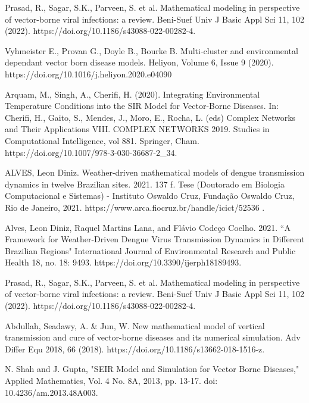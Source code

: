 \documentclass[12pt]{article}
\begin{document}
\noindent [2] Prasad, R., Sagar, S.K., Parveen, S. et al. Mathematical modeling in perspective of vector-borne viral infections: a review. Beni-Suef Univ J Basic Appl Sci 11, 102 (2022). https://doi.org/10.1186/s43088-022-00282-4.

\noindent [3] Vyhmeister E., Provan G., Doyle B., Bourke B. Multi-cluster and environmental dependant vector born disease models. Heliyon, Volume 6, Issue 9 (2020). https://doi.org/10.1016/j.heliyon.2020.e04090

\noindent [4] Arquam, M., Singh, A., Cherifi, H. (2020). Integrating Environmental Temperature Conditions into the SIR Model for Vector-Borne Diseases. In: Cherifi, H., Gaito, S., Mendes, J., Moro, E., Rocha, L. (eds) Complex Networks and Their Applications VIII. COMPLEX NETWORKS 2019. Studies in Computational Intelligence, vol 881. Springer, Cham. https://doi.org/10.1007/978-3-030-36687-2\_34.

\noindent [5] ALVES, Leon Diniz. Weather-driven mathematical models of dengue transmission dynamics in twelve Brazilian sites. 2021. 137 f. Tese (Doutorado em Biologia Computacional e Sistemas) - Instituto Oswaldo Cruz, Fundação Oswaldo Cruz, Rio de Janeiro, 2021. https://www.arca.fiocruz.br/handle/icict/52536	.

\noindent [6] Alves, Leon Diniz, Raquel Martins Lana, and Flávio Codeço Coelho. 2021. ``A Framework for Weather-Driven Dengue Virus Transmission Dynamics in Different Brazilian Regions" International Journal of Environmental Research and Public Health 18, no. 18: 9493. https://doi.org/10.3390/ijerph18189493.

\noindent [7] Prasad, R., Sagar, S.K., Parveen, S. et al. Mathematical modeling in perspective of vector-borne viral infections: a review. Beni-Suef Univ J Basic Appl Sci 11, 102 (2022). https://doi.org/10.1186/s43088-022-00282-4.

\noindent [8] Abdullah, Seadawy, A. & Jun, W. New mathematical model of vertical transmission and cure of vector-borne diseases and its numerical simulation. Adv Differ Equ 2018, 66 (2018). 
https://doi.org/10.1186/s13662-018-1516-z.

\noindent [9] N. Shah and J. Gupta, "SEIR Model and Simulation for Vector Borne Diseases," Applied Mathematics, Vol. 4 No. 8A, 2013, pp. 13-17. doi: 10.4236/am.2013.48A003.
\end{document}
